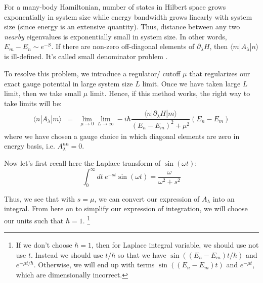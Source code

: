 \documentclass[11pt,a4paper]{article}
\begin{document}
For a many-body Hamiltonian, number of states in Hilbert space grows exponentially in system size while energy bandwidth grows linearly with system size (since energy is an extensive quantity). Thus, distance between any two \textit{nearby} eigenvalues is exponentially small in system size. In other words, $E_m-E_n \sim e^{-S}$. If there are non-zero off-diagonal elements of $\partial_{\lambda}H $, then $\langle m |A_{\lambda} | n \rangle$ is ill-defined. It's called small denominator problem \cite{kolodrubetz2016geometry}.


 
To resolve this problem, we introduce a regulator/ cutoff $\mu$ that regularizes our exact gauge potential in large system size $L$ limit. Once we have taken large $L$ limit, then we take small $\mu$ limit. Hence, if this method works, the right way to take limits will be:
\begin{eqnarray}
\langle n | A_{\lambda} | m \rangle &=& \lim_{\mu \rightarrow 0} \lim_{L \rightarrow \infty } -i \hbar \dfrac{\langle n | \partial_{\lambda}H  | m \rangle}{(E_n-E_m)^2 + \mu^2} (E_n-E_m) 
\label{off-digonal}
\end{eqnarray}
where we have chosen a gauge choice in which diagonal elements are zero in energy basis, i.e. $A_{\lambda}^{nn}=0$.

Now  let's first recall here the Laplace transform of $\sin(\omega t)$: 
\begin{equation}
\int_0^{\infty} dt\ e^{-s t} \sin(\omega t)= \dfrac{\omega}{ \omega^2 +s^2}
\end{equation}

Thus, we see that with $s=\mu$, we can convert our expression of $ A_{\lambda}$ into an integral.  
From here on to simplify our expression of integration, we will choose our units such that $\hbar=1$. \footnote{If we don't choose  $\hbar=1$, then for Laplace integral variable, we should use not use $t$. Instead we should use $t/\hbar$ so that we have $\sin((E_n-E_m)t/ \hbar)$ and $e^{-\mu t/ \hbar}$. Otherwise, we will end up with terms $\sin((E_n-E_m)t)$ and $e^{-\mu t}$, which are dimensionally incorrect.}
\end{document}
